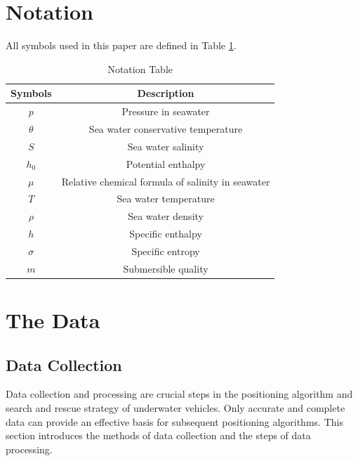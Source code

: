 \documentclass[12pt]{article}
\begin{document}
\section{Notation}

All symbols used in this paper are defined in Table \ref{tab:notation}.

\begin{table}[h!]
    \centering
    \caption{Notation Table}
    \vspace{.4cm}
    \begin{tabular}{cc}
        \toprule
        Symbols  & Description                                       \\ \midrule
        $p$      & Pressure in seawater                              \\
        $\theta$ & Sea water conservative temperature                \\
        $S$      & Sea water salinity                                \\
        $h_0$    & Potential enthalpy                                \\
        $\mu$    & Relative chemical formula of salinity in seawater \\
        $T$      & Sea water temperature                             \\
        $\rho$   & Sea water density                                 \\
        $h$      & Specific enthalpy                                 \\
        $\sigma$ & Specific entropy                                  \\
        $m$      & Submersible quality                               \\
        \bottomrule
    \end{tabular} \label{tab:notation}
\end{table}


\section{The Data}

\subsection{Data Collection}

Data collection and processing are crucial steps in the positioning algorithm and search and rescue strategy of underwater vehicles. Only accurate and complete data can provide an effective basis for subsequent positioning algorithms. This section introduces the methods of data collection and the steps of data processing.
\end{document}
